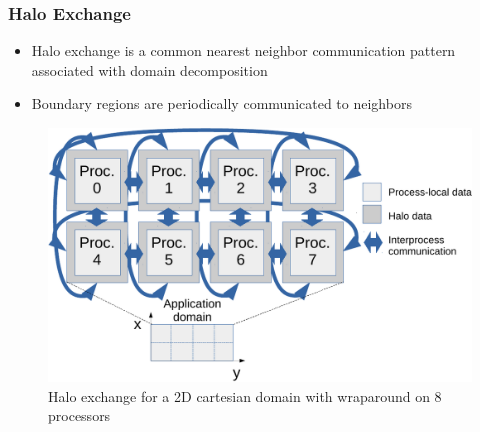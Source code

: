 \documentclass{beamer}
\begin{document}
\begin{frame}
\frametitle{Halo Exchange}
\begin{itemize}
  \item Halo exchange is a common nearest neighbor communication pattern
        associated with domain decomposition
  \item Boundary regions are periodically communicated to neighbors
\end{itemize}
\begin{figure}
  \centering
  \caption{Halo exchange for a 2D cartesian domain with wraparound on 8 processors}
  \includegraphics[width=0.55\linewidth]{../fig/halo-illustration}
\end{figure}
\end{frame}
\end{document}
